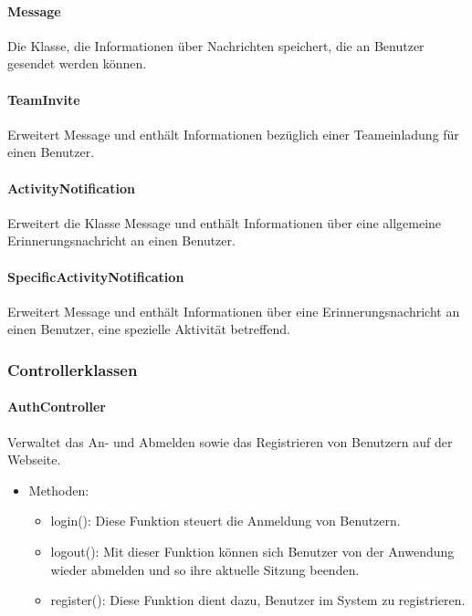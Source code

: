 	\paragraph{Message}Die Klasse, die Informationen \"uber Nachrichten speichert, die an Benutzer gesendet werden können.
	\paragraph{TeamInvite}Erweitert Message und enth\"alt Informationen bez\"uglich einer Teameinladung f\"ur einen Benutzer.
	\paragraph{ActivityNotification}Erweitert die Klasse Message und enth\"alt Informationen \"uber eine allgemeine Erinnerungsnachricht an einen Benutzer.
	\paragraph{SpecificActivityNotification}Erweitert Message und enth\"alt Informationen \"uber eine Erinnerungsnachricht an einen Benutzer, eine spezielle Aktivit\"at betreffend.

\subsubsection{Controllerklassen}
	\paragraph{AuthController}Verwaltet das An- und Abmelden sowie das Registrieren von Benutzern auf der Webseite.
		\begin{itemize}
			\item Methoden:
			\begin{itemize}
				\item login(): Diese Funktion steuert die Anmeldung von Benutzern.
				\item logout(): Mit dieser Funktion k\"onnen sich Benutzer von der Anwendung wieder abmelden und so ihre aktuelle Sitzung beenden.
				\item register(): Diese Funktion dient dazu, Benutzer im System zu registrieren.
			\end{itemize}
		\end{itemize}
